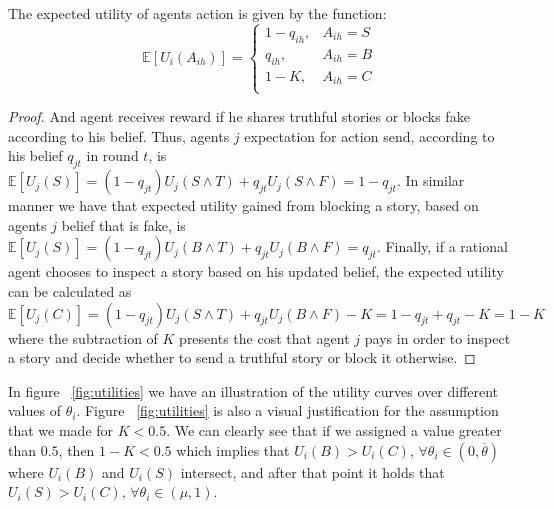 \begin{prop}
	The expected utility of agents action is given by the function:
	$$\mathbb{E} [U_i(A_{ih})] = 
	\begin{cases}
		1-q_{ih}, & A_{ih} = S  \\
		q_{ih}, & A_{ih} = B  \\
		1-K, & A_{ih} = C \\
	\end{cases} $$
	\label{prop:ExpUtility}
\end{prop}

\begin{proof}
	And agent receives reward if he shares truthful stories or blocks fake according to his belief. Thus, agents $j$ expectation for action send, according to his belief $q_{jt}$  in round $t$, is $\mathbb{E} [U_j(S)] =  (1-q_{jt}) U_j (S \land T) + q_{jt} U_j (S \land F)=1-q_{jt}$. In similar manner we have that expected utility gained from blocking a story, based on agents $j$ belief that is fake, is $\mathbb{E} [U_j(S)] =  (1-q_{jt}) U_j (B \land T) + q_{jt} U_j (B \land F)=q_{jt}$. Finally, if a rational agent chooses to inspect a story based on his updated belief, the expected utility can be calculated as $\mathbb{E} [U_j(C)] =  (1-q_{jt}) U_j (S \land T) + q_{jt} U_j (B \land F)-K=1-q_{jt}+q_{jt}-K=1-K$ where the subtraction of $K$ presents the cost that agent $j$ pays in order to inspect a story and decide whether to send a truthful story or block it otherwise.
\end{proof}

In figure ~\ref{fig:utilities} we have an illustration of the utility curves over different values of $\theta_i$. Figure ~\ref{fig:utilities} is also a visual justification for the assumption that we made for $K < 0.5$. We can clearly see that if we assigned a value greater than $0.5$, then $1-K<0.5$ which implies that $U_i(B) > U_i(C)$, $\forall \theta_i \in (0,\overline{\theta})$ where $U_i(B)$ and $U_i(S)$ intersect, and after that point it holds that $U_i(S) > U_i(C)$,  $\forall \theta_i \in (\mu,1)$.

